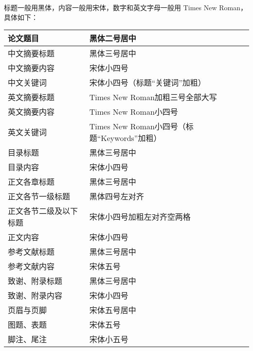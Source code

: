 标题一般用黑体，内容一般用宋体，数字和英文字母一般用 Times New Roman，具体如下：

\begin{center}
	\begin{tabular}{|l|l|}
		\hline
		论文题目        & 黑体二号居中                             \\
		\hline
		中文摘要标题      & 黑体三号居中                             \\
		\hline
		中文摘要内容      & 宋体小四号                              \\
		\hline
		中文关键词       & 宋体小四号（标题“关键词”加粗）                   \\
		\hline
		英文摘要标题      & Times New Roman加粗三号全部大写            \\
		\hline
		英文摘要内容      & Times New Roman小四号                 \\
		\hline
		英文关键词       & Times New Roman小四号（标题“Keywords”加粗） \\
		\hline
		目录标题        & 黑体三号居中                             \\
		\hline
		目录内容        & 宋体小四号                              \\
		\hline
		正文各章标题      & 黑体三号居中                             \\
		\hline
		正文各节一级标题    & 黑体四号左对齐                            \\
		\hline
		正文各节二级及以下标题 & 宋体小四号加粗左对齐空两格                      \\
		\hline
		正文内容        & 宋体小四号                              \\
		\hline
		参考文献标题      & 黑体三号居中                             \\
		\hline
		参考文献内容      & 宋体五号                               \\
		\hline
		致谢、附录标题     & 黑体三号居中                             \\
		\hline
		致谢、附录内容     & 宋体小四号                              \\
		\hline
		页眉与页脚       & 宋体五号居中                             \\
		\hline
		图题、表题       & 宋体五号                               \\
		\hline
		脚注、尾注       & 宋体小五号                              \\
		\hline
	\end{tabular}
\end{center}

